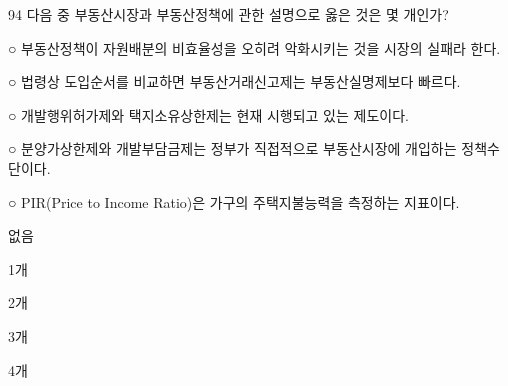 \begin{question}{94}
다음 중 부동산시장과 부동산정책에 관한 설명으로 옳은 것은 몇 개인가?
\begin{framedtext}
○ 부동산정책이 자원배분의 비효율성을 오히려 악화시키는 것을 시장의 실패라 한다. \par
○ 법령상 도입순서를 비교하면 부동산거래신고제는 부동산실명제보다 빠르다. \par
○ 개발행위허가제와 택지소유상한제는 현재 시행되고 있는 제도이다. \par
○ 분양가상한제와 개발부담금제는 정부가 직접적으로 부동산시장에 개입하는 정책수단이다. \par
○ PIR(Price to Income Ratio)은 가구의 주택지불능력을 측정하는 지표이다. \par
\end{framedtext}
\begin{choices}
  \item 없음
  \item 1개
  \item 2개
  \item 3개
  \item 4개
\end{choices}
\end{question}
